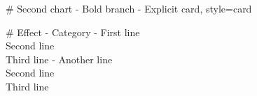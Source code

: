 \documentclass{article}
\begin{document}

\begin{mindchart}[bookmarks=true,style=underline]
# Second chart
  - Bold branch
    - Explicit card, style=card
\end{mindchart}

\begin{mindchart}[layout=fishbone,style=boxed]
# Effect
  - Category
    - First line\\Second line\\Third line
    - Another line\\Second line\\Third line
\end{mindchart}
\end{document}

